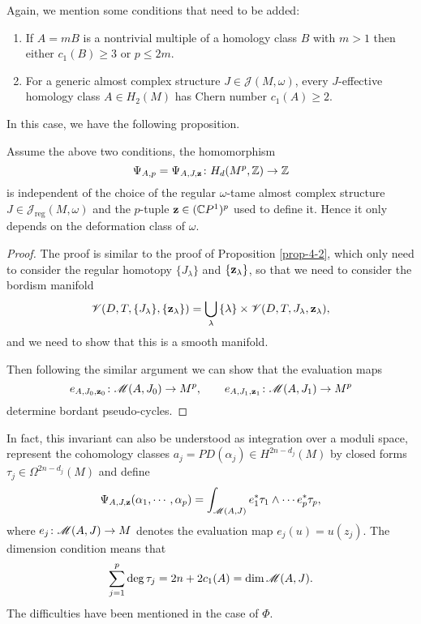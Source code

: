 \documentclass[twoside]{article}
\begin{document}
Again, we mention some conditions that need to be added:

\begin{enumerate}
    \item If $A=mB$ is a nontrivial multiple of a homology class $B$ 
    with $m>1$ then either $c_1(B)\geq 3$ or $p\leq 2m$.
    \item For a generic almost complex structure $J\in\mathscr{J}(M,\omega)$, 
    every $J$-effective homology class $A\in H_2(M)$ has Chern number $c_1(A)\geq 2$.
\end{enumerate}

In this case, we have the following proposition.

\begin{proposition}
    Assume the above two conditions, the homomorphism
    \[\Psi_{A,p}=\Psi_{A,J,\mathbf{z}}\colon H_d(M^p,\mathbb{Z})\rightarrow \mathbb{Z}\]
    is independent of the choice of the regular $\omega$-tame almost complex structure 
    $J\in \mathscr{J}_{\mathrm{reg}}(M,\omega)$ and the $p$-tuple $\mathbf{z}\in (\mathbb{C}P^{1})^p$ used to define it. 
    Hence it only depends on the deformation class of $\omega$.
\end{proposition}

\begin{proof}
    The proof is similar to the proof of Proposition \ref{prop-4-2}, 
    which only need to consider the regular homotopy $\{J_\lambda\}$ and $\{\mathbf{z}_\lambda\}$, 
    so that we need to consider the bordism manifold
    \[\mathscr{V}(D,T,\{J_\lambda\},\{\mathbf{z}_\lambda\})=\bigcup_{\lambda}{}\{\lambda\}\times\mathscr{V}(D,T,J_\lambda,\mathbf{z}_\lambda),\]
    and we need to show that this is a smooth manifold.
    
    Then following the similar argument we can show that the evaluation maps
    \[e_{A,J_0,\mathbf{z}_0}\colon \mathscr{M}(A,J_0)\rightarrow M^p, \qquad e_{A,J_1,\mathbf{z}_1}\colon \mathscr{M}(A,J_1)\rightarrow M^p\]
    determine bordant pseudo-cycles.
\end{proof}

In fact, this invariant can also be understood as integration over a moduli space, 
represent the cohomology classes $a_j=\mathit{PD}(\alpha_j)\in H^{2n-d_j}(M)$ 
by closed forms $\tau_j\in \Omega^{2n-d_j}(M)$ and define
\[\Psi_{A,J,\mathbf{z}}(\alpha_1,\cdots,\alpha_p)=\int_{\mathscr{M}(A,J)}e_1^*\tau_1\wedge\cdots e_p^*\tau_p,\]
where $e_j\colon \mathscr{M}(A,J)\rightarrow M$ denotes the evaluation map $e_j(u)=u(z_j)$. 
The dimension condition means that
\[\sum_{j=1}^p\deg \tau_j=2n+2c_1(A)=\dim\mathscr{M}(A,J).\]
The difficulties have been mentioned in the case of $\Phi$.
\end{document}
